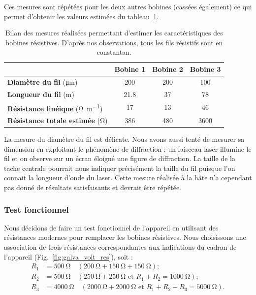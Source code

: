 \documentclass[12pt,a4paper,fleqn]{article}
\begin{document}
Ces mesures sont répétées pour les deux autres bobines (cassées également) ce qui permet d'obtenir les valeurs estimées du tableau~\ref{tab:bobines}.

\begin{table}[htbp]
    \center
    \begin{tabular}{l|c|c|c}
    & \textbf{Bobine 1} & \textbf{Bobine 2} & \textbf{Bobine 3} \\
    \hline \hline
    \textbf{Diamètre du fil} (\unit{\um})                           & \num{200} & \num{200}   & \num{100} \\
    \textbf{Longueur du fil} (\unit{m})                             & \num{21,8} & \num{37}    & \num{78}\\
    \textbf{Résistance linéique} (\unit{\ohm\per\metre})& \num{17}    & \num{13}    & \num{46}\\
    \textbf{Résistance totale estimée} (\unit{\ohm})       & \num{386}  & \num{480}  & \num{3600}\\
    \end{tabular}
    \caption{Bilan des mesures réalisées permettant d'estimer les caractéristiques des bobines résistives.
    D'après nos observations, tous les fils résistifs sont en constantan.}
    \label{tab:bobines}
\end{table}

La mesure du diamètre du fil est délicate.
Nous avons aussi tenté de mesurer sa dimension en exploitant le phénomène de diffraction : un faisceau laser illumine le fil et on observe sur un écran éloigné une figure de diffraction.
La taille de la tache centrale pourrait nous indiquer précisément la taille du fil puisque l'on connait la longueur d'onde du laser.
Cette mesure réalisée à la hâte n'a cependant pas donné de résultats satisfaisants et devrait être répétée.

\subsubsection{Test fonctionnel}

Nous décidons de faire un test fonctionnel de l'appareil en utilisant des résistances modernes pour remplacer les bobines résistives.
Nous choisissons une association de trois résistances correspondantes aux indications du cadran de l'appareil (Fig.~\ref{fig:galva_volt_res}), soit :
\begin{align*}
R_1 &= \qty{500}{\ohm} \quad (\qty{200}{\ohm} +\qty{150}{\ohm} + \qty{150}{\ohm}) ;\\
R_2 &= \qty{500}{\ohm} \quad (\qty{250}{\ohm} + \qty{250}{\ohm} \text{ et } R_1 + R_2 = \qty{1000}{\ohm}) ;\\
R_3 &= \qty{4000}{\ohm} \quad (\qty{2000}{\ohm} + \qty{2000}{\ohm} \text{ et } R_1 + R_2 + R_3 = \qty{5000}{\ohm}).
\end{align*}
\end{document}
